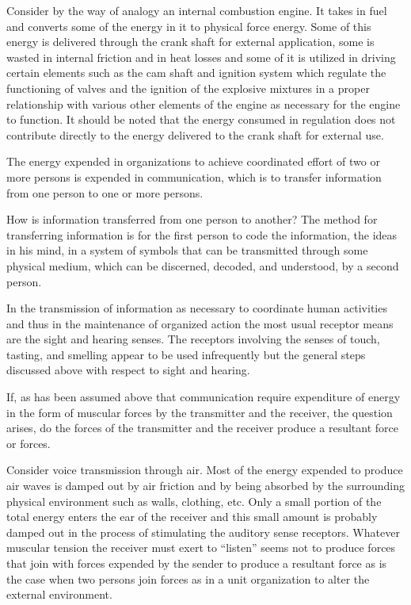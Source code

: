 Consider by the way of analogy an internal combustion engine. It takes in fuel and converts some of the energy in it to physical force energy. Some of this energy is delivered through the crank shaft for external application, some is wasted in internal friction and in heat losses and some of it is utilized in driving certain elements such as the cam shaft and ignition system which regulate the functioning of valves and the ignition of the explosive mixtures in a proper relationship with various other elements of the engine as necessary for the engine to function. It should be noted that the energy consumed in regulation does not contribute directly to the energy delivered to the crank shaft for external use.

The energy expended in organizations to achieve coordinated effort of two or more persons is expended in communication, which is to transfer information from one person to one or more persons.

How is information transferred from one person to another?  The method for transferring information is for the first person to code the information, the ideas in his mind, in a system of symbols that can be transmitted through some physical medium, which can be discerned, decoded, and understood, by a second person.

In the transmission of information as necessary to coordinate human activities and thus in the maintenance of organized action the most usual receptor means are the sight and hearing senses. The receptors involving the senses of touch, tasting, and smelling appear to be used infrequently but the general steps discussed above with respect to sight and hearing.

If, as has been assumed above that communication require expenditure of energy in the form of muscular forces by the transmitter and the receiver, the question arises, do the forces of the transmitter and the receiver produce a resultant force or forces.

Consider voice transmission through air. Most of the energy expended to produce air waves is damped out by air friction and by being absorbed by the surrounding physical environment such as walls, clothing, etc. Only a small portion of the total energy enters the ear of the receiver and this small amount is probably damped out in the process of stimulating the auditory sense receptors. Whatever muscular tension the receiver must exert to ``listen'' seems not to produce forces that join with forces expended by the sender to produce a resultant force as is the case when two persons join forces as in a unit organization to alter the external environment.

